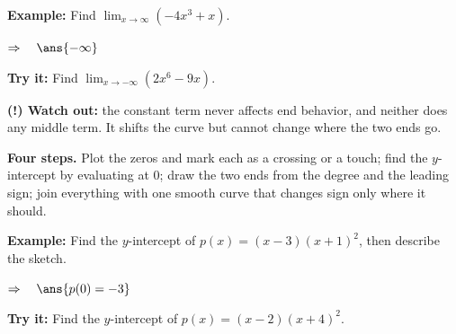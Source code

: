 \documentclass[12pt]{article}
\begin{document}
\begin{examplebox}
\textbf{Example:} \quad Find $\displaystyle\lim_{x \to \infty} \left(-4x^{3} + x\right)$.

$\Rightarrow\quad \ans{-\infty}$
\end{examplebox}

\begin{tryitbox}
\textbf{Try it:} \quad Find $\displaystyle\lim_{x \to -\infty} \left(2x^{6} - 9x\right)$.\\[2pt]
\end{tryitbox}

\begin{watchoutbox}
\textbf{(!) Watch out:} the constant term never affects end behavior, and neither does any middle term. It shifts the curve but cannot change where the two ends go.
\end{watchoutbox}


\begin{formulabox}
\textbf{Four steps.} Plot the zeros and mark each as a crossing or a touch; find the $y$-intercept by evaluating at $0$; draw the two ends from the degree and the leading sign; join everything with one smooth curve that changes sign only where it should.
\end{formulabox}

\begin{examplebox}
\textbf{Example:} \quad Find the $y$-intercept of $p(x) = (x - 3)(x + 1)^{2}$, then describe the sketch.

$\Rightarrow\quad \ans{p(0) = -3}$
\end{examplebox}

\begin{tryitbox}
\textbf{Try it:} \quad Find the $y$-intercept of $p(x) = (x - 2)(x + 4)^{2}$.\\[2pt]
\end{tryitbox}
\end{document}

